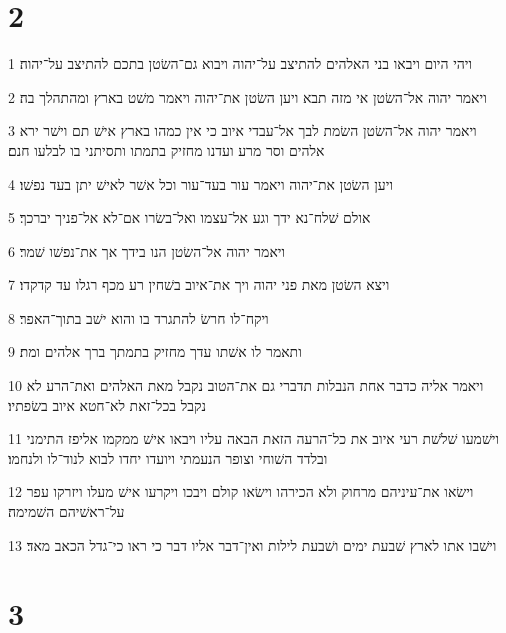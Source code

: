 \chapter{2}

\par 1 ויהי היום ויבאו בני האלהים להתיצב על־יהוה ויבוא גם־השׂטן בתכם להתיצב על־יהוה׃
\par 2 ויאמר יהוה אל־השׂטן אי מזה תבא ויען השׂטן את־יהוה ויאמר משׁט בארץ ומהתהלך בה׃
\par 3 ויאמר יהוה אל־השׂטן השׂמת לבך אל־עבדי איוב כי אין כמהו בארץ אישׁ תם וישׁר ירא אלהים וסר מרע ועדנו מחזיק בתמתו ותסיתני בו לבלעו חנם׃
\par 4 ויען השׂטן את־יהוה ויאמר עור בעד־עור וכל אשׁר לאישׁ יתן בעד נפשׁו׃
\par 5 אולם שׁלח־נא ידך וגע אל־עצמו ואל־בשׂרו אם־לא אל־פניך יברכך׃
\par 6 ויאמר יהוה אל־השׂטן הנו בידך אך את־נפשׁו שׁמר׃
\par 7 ויצא השׂטן מאת פני יהוה ויך את־איוב בשׁחין רע מכף רגלו עד קדקדו׃
\par 8 ויקח־לו חרשׂ להתגרד בו והוא ישׁב בתוך־האפר׃
\par 9 ותאמר לו אשׁתו עדך מחזיק בתמתך ברך אלהים ומת׃
\par 10 ויאמר אליה כדבר אחת הנבלות תדברי גם את־הטוב נקבל מאת האלהים ואת־הרע לא נקבל בכל־זאת לא־חטא איוב בשׂפתיו׃
\par 11 וישׁמעו שׁלשׁת רעי איוב את כל־הרעה הזאת הבאה עליו ויבאו אישׁ ממקמו אליפז התימני ובלדד השׁוחי וצופר הנעמתי ויועדו יחדו לבוא לנוד־לו ולנחמו׃
\par 12 וישׂאו את־עיניהם מרחוק ולא הכירהו וישׂאו קולם ויבכו ויקרעו אישׁ מעלו ויזרקו עפר על־ראשׁיהם השׁמימה׃
\par 13 וישׁבו אתו לארץ שׁבעת ימים ושׁבעת לילות ואין־דבר אליו דבר כי ראו כי־גדל הכאב מאד׃

\chapter{3}

